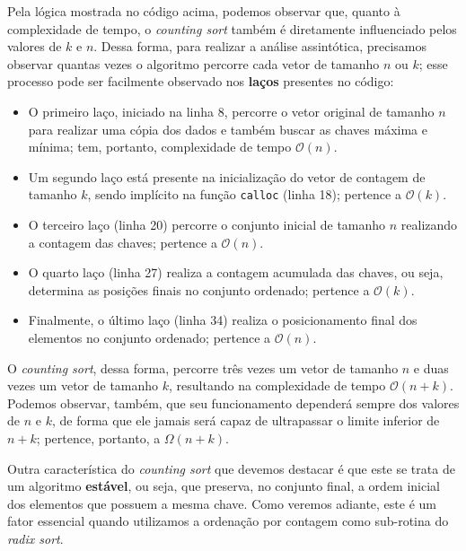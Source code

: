 \documentclass[fontsize=10pt]{article}
\begin{document}
\quad Pela lógica mostrada no código acima, podemos observar que, quanto à complexidade de tempo, o \textit{counting sort} também é diretamente influenciado pelos valores de $k$ e $n$. Dessa forma, para realizar a análise assintótica, precisamos observar quantas vezes o algoritmo percorre cada vetor de tamanho $n$ ou $k$; esse processo pode ser facilmente observado nos \textbf{laços} presentes no código:

\begin{itemize}
    \item O primeiro laço, iniciado na linha 8, percorre o vetor original de tamanho $n$ para realizar uma cópia dos dados e também buscar as chaves máxima e mínima; tem, portanto, complexidade de tempo $\mathcal{O}(n)$.
    
    \item Um segundo laço está presente na inicialização do vetor de contagem de tamanho $k$, sendo implícito na função \texttt{calloc} (linha 18); pertence a $\mathcal{O}(k)$.
    
    \item O terceiro laço (linha 20) percorre o conjunto inicial de tamanho $n$ realizando a contagem das chaves; pertence a $\mathcal{O}(n)$.
    
    \item O quarto laço (linha 27) realiza a contagem acumulada das chaves, ou seja, determina as posições finais no conjunto ordenado; pertence a $\mathcal{O}(k)$.
    
    \item Finalmente, o último laço (linha 34) realiza o posicionamento final dos elementos no conjunto ordenado; pertence a $\mathcal{O}(n)$.
\end{itemize}

\quad O \textit{counting sort}, dessa forma, percorre três vezes um vetor de tamanho $n$ e duas vezes um vetor de tamanho $k$, resultando na complexidade de tempo $\mathcal{O}(n + k)$. Podemos observar, também, que seu funcionamento dependerá sempre dos valores de $n$ e $k$, de forma que ele jamais será capaz de ultrapassar o limite inferior de $n + k$; pertence, portanto, a $\Omega(n + k)$.

\quad Outra característica do \textit{counting sort} que devemos destacar é que este se trata de um algoritmo \textbf{estável}, ou seja, que preserva, no conjunto final, a ordem inicial dos elementos que possuem a mesma chave. Como veremos adiante, este é um fator essencial quando utilizamos a ordenação por contagem como sub-rotina do \textit{radix sort}.
\end{document}
